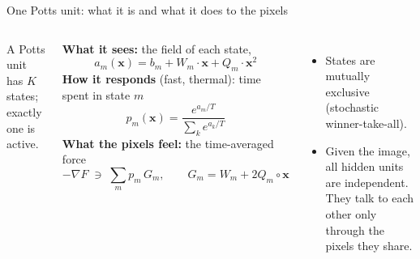 \documentclass[aspectratio=169,10pt]{beamer}
\newcommand{\x}{\bm{x}}
\begin{document}
\begin{frame}{One Potts unit: what it is and what it does to the pixels}
  \begin{columns}[T,onlytextwidth]
      A Potts unit has $K$ states; exactly one is active.
      \vspace{0.15cm}

      \textbf{What it sees:} the field of each state,
      \[
        a_m(\x)=b_m+W_m\!\cdot\!\x+Q_m\!\cdot\!\x^{2}
      \]
      \textbf{How it responds} (fast, thermal): time spent in state $m$
      \[
        p_m(\x)=\frac{e^{a_m/T}}{\sum_k e^{a_k/T}}
      \]
      \textbf{What the pixels feel:} the time-averaged force
      \[
        -\nabla F\;\ni\;\sum_m p_m\,G_m,\qquad G_m=W_m+2Q_m\!\circ\!\x
      \]
      \vspace{0.2cm}
      \begin{itemize}\setlength{\itemsep}{8pt}
        \item States are mutually exclusive (stochastic winner-take-all).
        \item Given the image, all hidden units are independent. They talk to each other
          only through the pixels they share.
      \end{itemize}
  \end{columns}
\end{frame}
\end{document}
